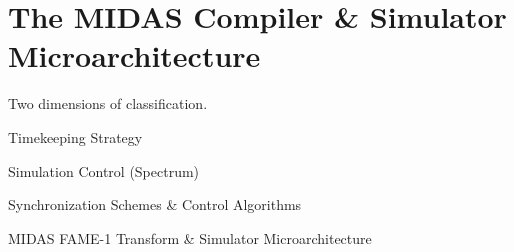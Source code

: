 \section{The MIDAS Compiler \& Simulator Microarchitecture}



Two dimensions of classification.

Timekeeping Strategy

Simulation Control (Spectrum)

Synchronization Schemes \& Control Algorithms

MIDAS FAME-1 Transform \& Simulator Microarchitecture

